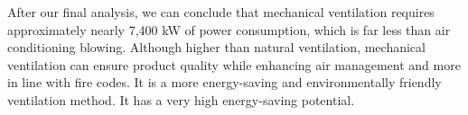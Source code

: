 After our final analysis, we can conclude that mechanical ventilation requires approximately nearly 7,400 kW of power consumption, which is far less than air conditioning blowing. Although higher than natural ventilation, mechanical ventilation can ensure product quality while enhancing air management and more in line with fire codes. It is a more energy-saving and environmentally friendly ventilation method. It has a very high energy-saving potential.

